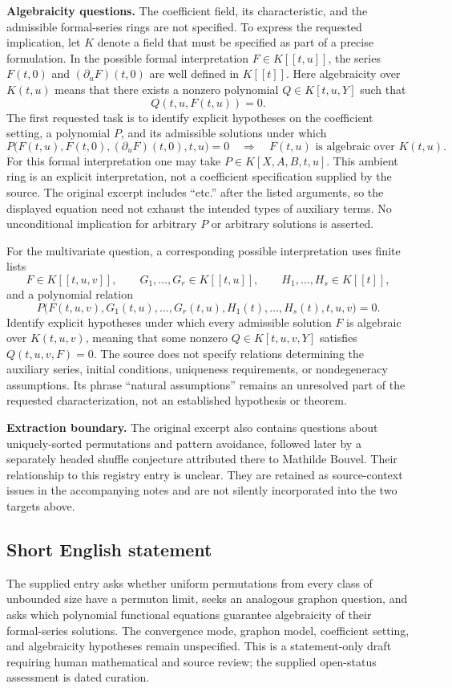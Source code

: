 \documentclass[11pt]{article}
\begin{document}
\textbf{Algebraicity questions.} The coefficient field, its characteristic, and the admissible formal-series rings are not specified. To express the requested implication, let \(K\) denote a field that must be specified as part of a precise formulation. In the possible formal interpretation \(F\in K[[t,u]]\), the series \(F(t,0)\) and \((\partial_uF)(t,0)\) are well defined in \(K[[t]]\). Here algebraicity over \(K(t,u)\) means that there exists a nonzero polynomial \(Q\in K[t,u,Y]\) such that
\[
Q(t,u,F(t,u))=0.
\]
The first requested task is to identify explicit hypotheses on the coefficient setting, a polynomial \(P\), and its admissible solutions under which
\[
P\bigl(F(t,u),F(t,0),(\partial_uF)(t,0),t,u\bigr)=0
\quad\Longrightarrow\quad
F(t,u)\text{ is algebraic over }K(t,u).
\]
For this formal interpretation one may take \(P\in K[X,A,B,t,u]\). This ambient ring is an explicit interpretation, not a coefficient specification supplied by the source. The original excerpt includes ``etc.'' after the listed arguments, so the displayed equation need not exhaust the intended types of auxiliary terms. No unconditional implication for arbitrary \(P\) or arbitrary solutions is asserted.

For the multivariate question, a corresponding possible interpretation uses finite lists
\[
F\in K[[t,u,v]],\qquad
G_1,\ldots,G_r\in K[[t,u]],\qquad
H_1,\ldots,H_s\in K[[t]],
\]
and a polynomial relation
\[
P\bigl(F(t,u,v),G_1(t,u),\ldots,G_r(t,u),
H_1(t),\ldots,H_s(t),t,u,v\bigr)=0.
\]
Identify explicit hypotheses under which every admissible solution \(F\) is algebraic over \(K(t,u,v)\), meaning that some nonzero \(Q\in K[t,u,v,Y]\) satisfies \(Q(t,u,v,F)=0\). The source does not specify relations determining the auxiliary series, initial conditions, uniqueness requirements, or nondegeneracy assumptions. Its phrase ``natural assumptions'' remains an unresolved part of the requested characterization, not an established hypothesis or theorem.

\textbf{Extraction boundary.} The original excerpt also contains questions about uniquely-sorted permutations and pattern avoidance, followed later by a separately headed shuffle conjecture attributed there to Mathilde Bouvel. Their relationship to this registry entry is unclear. They are retained as source-context issues in the accompanying notes and are not silently incorporated into the two targets above.
\subsection{Short English statement}
The supplied entry asks whether uniform permutations from every class of unbounded size have a permuton limit, seeks an analogous graphon question, and asks which polynomial functional equations guarantee algebraicity of their formal-series solutions. The convergence mode, graphon model, coefficient setting, and algebraicity hypotheses remain unspecified. This is a statement-only draft requiring human mathematical and source review; the supplied open-status assessment is dated curation.
\end{document}
